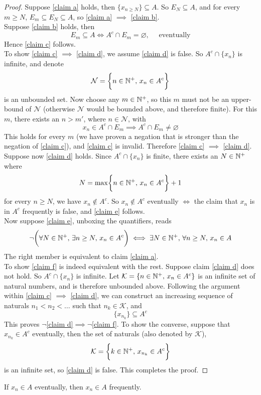 \documentclass[../../main.tex]{subfiles}
\begin{document}
\begin{proof}
    Suppose \ref{claim a} holds, then $\{x_{n\geq N}\}\subseteq A$. So $E_N\subseteq A$, and for every $m\geq N$, $E_m\subseteq E_N\subseteq A$, so \ref{claim a} $\implies$ \ref{claim b}.\\
    
    Suppose \ref{claim b} holds, then 
    \[
    E_m\subseteq A\iff A^c\cap E_m=\varnothing,\quad\text{ eventually}
    \]
    Hence \ref{claim c} follows.\\
    
    To show \ref{claim c} $\implies$ \ref{claim d}, we assume \ref{claim d} is false. So $A^c\cap\{x_n\}$ is infinite, and denote
    \[
    \mathcal{N}=\biggl\{n\in\mathbb{N}^+,\, x_n\in A^c\biggr\}
    \]
    is an unbounded set. Now choose any $m\in\mathbb{N}^+$, so this $m$ must not be an upper-bound of $\mathcal{N}$ (otherwise $\mathcal{N}$ would be bounded above, and therefore finite). For this $m$, there exists an $n>m'$, where $n\in\mathcal{N}$, with
    \[
    x_n\in A^c\cap E_m\implies A^c\cap E_m\neq\varnothing
    \]
    This holds for every $m$ (we have proven a negation that is stronger than the negation of \ref{claim c}), and \ref{claim c} is invalid. Therefore \ref{claim c} $\implies$ \ref{claim d}.\\
    
    Suppose now \ref{claim d} holds. Since $A^c\cap\{x_n\}$ is finite, there exists an $N\in\mathbb{N}^+$ where 
    \[
    N=\max\biggl\{n\in\mathbb{N}^+,\,x_n\in A^c\biggr\}+1
    \]
    for every $n\geq N$, we have $x_n\notin A^c$. So $x_n\notin A^c$ eventually $\iff$ the claim that  $x_n$ is in $A^c$ frequently is false, and \ref{claim e} follows.\\
    
    Now suppose \ref{claim e}, unboxing the quantifiers, reads
    \[
    \neg\biggl(\forall N\in\mathbb{N}^+,\,\exists n\geq N,\,x_n\in A^c\biggr)\iff \exists N\in\mathbb{N}^+,\,\forall n\geq N,\, x_n\in A
    \]
    The right member is equivalent to claim \ref{claim a}.\\
    
    To show \ref{claim f} is indeed equivalent with the rest. Suppose claim \ref{claim d} does not hold. So $A^c\cap \{x_n\}$ is infinite. Let $\mathcal{K}=\{n\in\mathbb{N}^+,\,x_n\in A^c\}$ is an infinite set of natural numbers, and is therefore unbounded above. Following the argument within \ref{claim c} $\implies$ \ref{claim d}, we can construct an increasing sequence of naturals $n_1<n_2<\ldots$ such that $n_k\in \mathcal{K}$, and
    \[
    \{x_{n_k}\}\subseteq A^c
    \]
    This proves $\neg$\ref{claim d}$\implies\neg$\ref{claim f}. To show the converse, suppose that $x_{n_k}\in A^c$ eventually, then the set of naturals (also denoted by $\mathcal{K}$), 
    \[
    \mathcal{K}=\biggl\{k\in\mathbb{N}^+,\,x_{n_k}\in A^c\biggr\}
    \]
    is an infinite set, so \ref{claim d} is false. This completes the proof.
\end{proof}

\begin{corollary}
    If $x_n\in A$ eventually, then $x_n\in A$ frequently.
\end{corollary}
\end{document}
